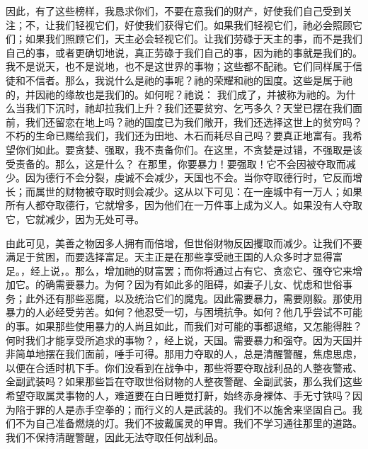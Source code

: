 因此，有了这些榜样，我恳求你们，不要在意我们的财产，好使我们自己受到关注；不，让我们轻视它们，好使我们获得它们。如果我们轻视它们，祂必会照顾它们；如果我们照顾它们，天主必会轻视它们。让我们劳碌于天主的事，而不是我们自己的事，或者更确切地说，真正劳碌于我们自己的事，因为祂的事就是我们的。我不是说天，也不是说地，也不是这世界的事物；这些都不配祂。它们同样属于信徒和不信者。那么，我说什么是祂的事呢？祂的荣耀和祂的国度。这些是属于祂的，并因祂的缘故也是我们的。如何呢？祂说： 我们成了，并被称为祂的。为什么当我们下沉时，祂却拉我们上升？我们还要贫穷、乞丐多久？天堂已摆在我们面前，我们还留恋在地上吗？祂的国度已为我们敞开，我们还选择这世上的贫穷吗？不朽的生命已赐给我们，我们还为田地、木石而耗尽自己吗？要真正地富有。我希望你们如此。要贪婪、强取，我不责备你们。在这里，不贪婪是过错，不强取是该受责备的。那么，这是什么？ 在那里，你要暴力！要强取！它不会因被夺取而减少。因为德行不会分裂，虔诚不会减少，天国也不会。当你夺取德行时，它反而增长；而属世的财物被夺取时则会减少。这从以下可见：在一座城中有一万人；如果所有人都夺取德行，它就增多，因为他们在一万件事上成为义人。如果没有人夺取它，它就减少，因为无处可寻。\par

由此可见，美善之物因多人拥有而倍增，但世俗财物反因攫取而减少。让我们不要满足于贫困，而要选择富足。天主正是在那些享受祂王国的人众多时才显得富足。，经上说，。那么，增加祂的财富罢；而你将通过占有它、贪恋它、强夺它来增加它。的确需要暴力。为何？因为有如此多的阻碍，如妻子儿女、忧虑和世俗事务；此外还有那些恶魔，以及统治它们的魔鬼。因此需要暴力，需要刚毅。那使用暴力的人必经受劳苦。如何？他忍受一切，与困境抗争。如何？他几乎尝试不可能的事。如果那些使用暴力的人尚且如此，而我们对可能的事都退缩，又怎能得胜？何时我们才能享受所追求的事物？，经上说，天国。需要暴力和强夺。因为天国并非简单地摆在我们面前，唾手可得。那用力夺取的人，总是清醒警醒，焦虑思虑，以便在合适时机下手。你们没看到在战争中，那些将要夺取战利品的人整夜警戒、全副武装吗？如果那些旨在夺取世俗财物的人整夜警醒、全副武装，那么我们这些希望夺取属灵事物的人，难道要在白日睡觉打鼾，始终赤身裸体、手无寸铁吗？因为陷于罪的人是赤手空拳的；而行义的人是武装的。我们不以施舍来坚固自己。我们不为自己准备燃烧的灯。我们不披戴属灵的甲胄。我们不学习通往那里的道路。我们不保持清醒警醒，因此无法夺取任何战利品。\par

